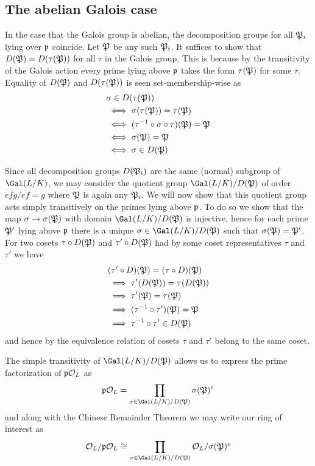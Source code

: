 \subsection{The abelian Galois case}

In the case that the Galois group is abelian, the decomposition groups for all $\mathfrak{P}_i$ lying over $\mathfrak{p}$ coincide.
Let $\mathfrak{P}$ be any such $\mathfrak{P}_i$.
It suffices to show that $D(\mathfrak{P})=D(\tau(\mathfrak{P}))$ for all $\tau$ in the Galois group.
This is because by the transitivity of the Galois action every prime lying above $\mathfrak{p}$ takes the form $\tau(\mathfrak{P})$ for some $\tau$.
Equality of $D(\mathfrak{P})$ and $D(\tau(\mathfrak{P}))$ is seen set-membership-wise as
\begin{align}
    &\sigma\in D(\tau(\mathfrak{P})) \\
    &\iff \sigma(\tau(\mathfrak{P}))=\tau(\mathfrak{P}) \\
    &\iff (\tau^{-1}\circ\sigma\circ\tau)(\mathfrak{P}) = \mathfrak{P} \\
    &\iff \sigma(\mathfrak{P}) = \mathfrak{P} \\
    &\iff \sigma\in D(\mathfrak{P})
\end{align}

Since all decomposition groups $D(\mathfrak{P}_i)$ are the same (normal) subgroup of $\Gal(L/K)$, we may consider the quotient group $\Gal(L/K)/D(\i{P})$ of order $efg/ef=g$ where $\mathfrak{P}$ is again any $\mathfrak{P}_i$.
We will now show that this quotient group acts simply transitively on the primes lying above $\mathfrak{p}$.
To do so we show that the map $\sigma\to\sigma(\mathfrak{P})$ with domain $\Gal(L/K)/D(\i{P})$ is injective, hence for each prime $\mathfrak{P}'$ lying above $\mathfrak{p}$ there is a unique $\sigma\in\Gal(L/K)/D(\i{P})$ such that $\sigma(\mathfrak{P})=\mathfrak{P}'$.
For two cosets $\tau\circ D(\mathfrak{P})$ and $\tau'\circ D(\mathfrak{P})$ had by some coset representatives $\tau$ and $\tau'$ we have
\begin{align}
    &(\tau'\circ D)(\mathfrak{P}) = (\tau\circ D)(\mathfrak{P}) \\
    &\implies \tau'(D(\mathfrak{P})) = \tau(D(\mathfrak{P})) \\
    &\implies \tau'(\mathfrak{P}) = \tau(\mathfrak{P}) \\
    &\implies (\tau^{-1}\circ\tau')(\mathfrak{P})=\mathfrak{P} \\
    &\implies \tau^{-1}\circ\tau'\in D(\mathfrak{P})
\end{align}
and hence by the equivalence relation of cosets $\tau$ and $\tau'$ belong to the same coset.

The simple transitivity of $\Gal(L/K)/D(\i{P})$ allows us to express the prime factorization of $\mathfrak{p}\mathcal{O}_L$ as
\begin{equation}
    \i{p}\O_L =
    \prod_{\sigma\in\Gal(L/K)/D(\i{P})} \sigma(\i{P})^e
\end{equation}
and along with the Chinese Remainder Theorem we may write our ring of interest as
\begin{align}
    \O_L/\i{p}\O_L\cong
    \prod_{\sigma\in\Gal(L/K)/D(\i{P})} \O_L/\sigma(\i{P})^e
\end{align}



